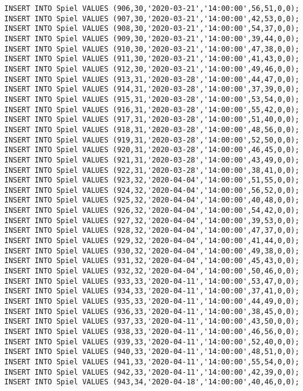 \documentclass{lehramt-informatik-aufgabe}
\begin{document}
\begin{verbatim}
INSERT INTO Spiel VALUES (906,30,'2020-03-21','14:00:00',56,51,0,0);
INSERT INTO Spiel VALUES (907,30,'2020-03-21','14:00:00',42,53,0,0);
INSERT INTO Spiel VALUES (908,30,'2020-03-21','14:00:00',54,37,0,0);
INSERT INTO Spiel VALUES (909,30,'2020-03-21','14:00:00',39,44,0,0);
INSERT INTO Spiel VALUES (910,30,'2020-03-21','14:00:00',47,38,0,0);
INSERT INTO Spiel VALUES (911,30,'2020-03-21','14:00:00',41,43,0,0);
INSERT INTO Spiel VALUES (912,30,'2020-03-21','14:00:00',49,46,0,0);
INSERT INTO Spiel VALUES (913,31,'2020-03-28','14:00:00',44,47,0,0);
INSERT INTO Spiel VALUES (914,31,'2020-03-28','14:00:00',37,39,0,0);
INSERT INTO Spiel VALUES (915,31,'2020-03-28','14:00:00',53,54,0,0);
INSERT INTO Spiel VALUES (916,31,'2020-03-28','14:00:00',55,42,0,0);
INSERT INTO Spiel VALUES (917,31,'2020-03-28','14:00:00',51,40,0,0);
INSERT INTO Spiel VALUES (918,31,'2020-03-28','14:00:00',48,56,0,0);
INSERT INTO Spiel VALUES (919,31,'2020-03-28','14:00:00',52,50,0,0);
INSERT INTO Spiel VALUES (920,31,'2020-03-28','14:00:00',46,45,0,0);
INSERT INTO Spiel VALUES (921,31,'2020-03-28','14:00:00',43,49,0,0);
INSERT INTO Spiel VALUES (922,31,'2020-03-28','14:00:00',38,41,0,0);
INSERT INTO Spiel VALUES (923,32,'2020-04-04','14:00:00',51,55,0,0);
INSERT INTO Spiel VALUES (924,32,'2020-04-04','14:00:00',56,52,0,0);
INSERT INTO Spiel VALUES (925,32,'2020-04-04','14:00:00',40,48,0,0);
INSERT INTO Spiel VALUES (926,32,'2020-04-04','14:00:00',54,42,0,0);
INSERT INTO Spiel VALUES (927,32,'2020-04-04','14:00:00',39,53,0,0);
INSERT INTO Spiel VALUES (928,32,'2020-04-04','14:00:00',47,37,0,0);
INSERT INTO Spiel VALUES (929,32,'2020-04-04','14:00:00',41,44,0,0);
INSERT INTO Spiel VALUES (930,32,'2020-04-04','14:00:00',49,38,0,0);
INSERT INTO Spiel VALUES (931,32,'2020-04-04','14:00:00',45,43,0,0);
INSERT INTO Spiel VALUES (932,32,'2020-04-04','14:00:00',50,46,0,0);
INSERT INTO Spiel VALUES (933,33,'2020-04-11','14:00:00',53,47,0,0);
INSERT INTO Spiel VALUES (934,33,'2020-04-11','14:00:00',37,41,0,0);
INSERT INTO Spiel VALUES (935,33,'2020-04-11','14:00:00',44,49,0,0);
INSERT INTO Spiel VALUES (936,33,'2020-04-11','14:00:00',38,45,0,0);
INSERT INTO Spiel VALUES (937,33,'2020-04-11','14:00:00',43,50,0,0);
INSERT INTO Spiel VALUES (938,33,'2020-04-11','14:00:00',46,56,0,0);
INSERT INTO Spiel VALUES (939,33,'2020-04-11','14:00:00',52,40,0,0);
INSERT INTO Spiel VALUES (940,33,'2020-04-11','14:00:00',48,51,0,0);
INSERT INTO Spiel VALUES (941,33,'2020-04-11','14:00:00',55,54,0,0);
INSERT INTO Spiel VALUES (942,33,'2020-04-11','14:00:00',42,39,0,0);
INSERT INTO Spiel VALUES (943,34,'2020-04-18','14:00:00',40,46,0,0);

\end{verbatim}
\end{document}
